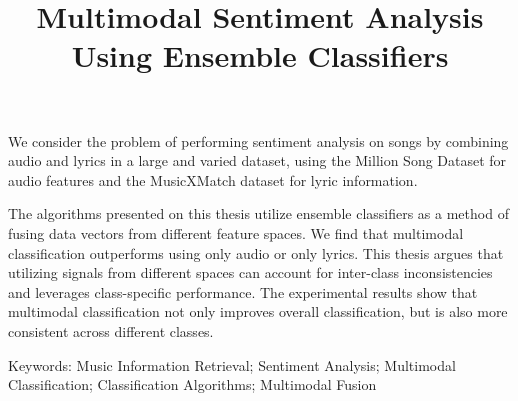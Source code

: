 \title{Multimodal Sentiment Analysis Using Ensemble Classifiers}

We consider the problem of performing sentiment analysis on songs
 by combining audio and lyrics in a large and varied dataset, 
 using the Million Song Dataset for audio features and the 
 MusicXMatch dataset for lyric information. 
 
 The algorithms presented on this thesis utilize ensemble classifiers
  as a method of fusing data vectors from different feature spaces.  
  We find that multimodal classification outperforms using only audio 
  or only lyrics. This thesis argues that utilizing signals from different 
  spaces can account for inter-class inconsistencies and leverages
   class-specific performance. The experimental results show that 
   multimodal classification not only improves overall classification, 
   but is also more consistent across different classes. 
 


Keywords: Music Information Retrieval; Sentiment Analysis; 
Multimodal Classification; Classification Algorithms; Multimodal Fusion
